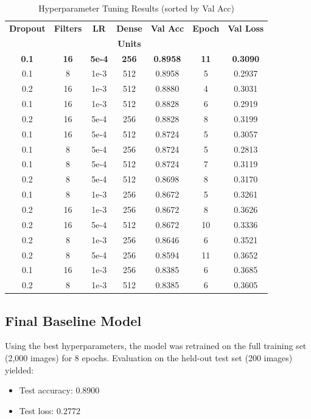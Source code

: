 \documentclass[conference]{IEEEtran}
\begin{document}
\begin{table}[htbp]
	\caption{Hyperparameter Tuning Results (sorted by Val Acc)}
	\label{table:hp_results}
	\centering
	\begin{adjustbox}{width=0.48\textwidth}
		\begin{tabular}{|c|c|c|c|c|c|c|}
			\hline
			\textbf{Dropout} & \textbf{Filters} & \textbf{LR} & \textbf{Dense} & \textbf{Val Acc} & \textbf{Epoch} & \textbf{Val Loss} \\
			& & & \textbf{Units} & & & \\
			\hline
			\rowcolor{yellow}
			\bfseries 0.1 & \bfseries 16 & \bfseries 5e‑4 & \bfseries 256 & \bfseries 0.8958 & \bfseries 11 & \bfseries 0.3090 \\
			0.1 & 8  & 1e‑3 & 512 & 0.8958 &  5 & 0.2937 \\
			0.2 & 16 & 1e‑3 & 512 & 0.8880 &  4 & 0.3031 \\
			0.1 & 16 & 1e‑3 & 512 & 0.8828 &  6 & 0.2919 \\
			0.2 & 16 & 5e‑4 & 256 & 0.8828 &  8 & 0.3199 \\
			0.1 & 16 & 5e‑4 & 512 & 0.8724 &  5 & 0.3057 \\
			0.1 & 8  & 5e‑4 & 256 & 0.8724 &  5 & 0.2813 \\
			0.1 & 8  & 5e‑4 & 512 & 0.8724 &  7 & 0.3119 \\
			0.2 & 8  & 5e‑4 & 512 & 0.8698 &  8 & 0.3170 \\
			0.1 & 8  & 1e‑3 & 256 & 0.8672 &  5 & 0.3261 \\
			0.2 & 16 & 1e‑3 & 256 & 0.8672 &  8 & 0.3626 \\
			0.2 & 16 & 5e‑4 & 512 & 0.8672 & 10 & 0.3336 \\
			0.2 & 8  & 1e‑3 & 256 & 0.8646 &  6 & 0.3521 \\
			0.2 & 8  & 5e‑4 & 256 & 0.8594 & 11 & 0.3652 \\
			0.1 & 16 & 1e‑3 & 256 & 0.8385 &  6 & 0.3685 \\
			0.2 & 8  & 1e‑3 & 512 & 0.8385 &  6 & 0.3605 \\
			\hline
		\end{tabular}
	\end{adjustbox}
\end{table}

\subsection{Final Baseline Model}
Using the best hyperparameters, the model was retrained on the full training set (2,000 images) for 8 epochs. Evaluation on the held-out test set (200 images) yielded:
\begin{itemize}
	\item Test accuracy: 0.8900
	\item Test loss: 0.2772
\end{itemize}
\end{document}
